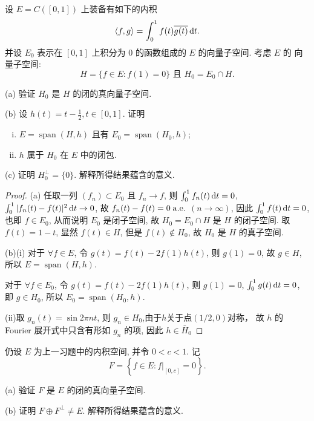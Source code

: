 \begin{exercise}
    设 $E=C([0,1])$ 上装备有如下的内积
    \[
    \langle f,g\rangle=\int_{0}^{1} f(t) \overline{g(t)}\mathop{}\!\mathrm{d} t.
    \]
    并设 $E_{0}$ 表示在 $[0,1]$ 上积分为 $0$ 的函数组成的 $E$ 的向量子空间. 考虑 $E$ 的 向量子空间:
    \[
    H=\{f \in E: f(1)=0\} \text {\ 且\ } H_{0}=E_{0} \cap H.
    \]

    (a) 验证 $H_{0}$ 是 $H$ 的闭的真向量子空间.

    (b) 设 $h(t)=t-\frac{1}{2}, t \in[0,1]$. 证明
    \begin{enumerate}[(i)]
    \item $E=\operatorname{span}(H, h)$ 且有 $E_{0}=\operatorname{span}\left(H_{0}, h\right)$;
    \item $h$ 属于 $H_{0}$ 在 $E$ 中的闭包.
    \end{enumerate}

    (c) 证明 $H_{0}^{\perp}=\{0\}$. 解释所得结果蕴含的意义.
\end{exercise}

\begin{proof}
    (a) 任取一列 $(f_n)\subset E_0$ 且 $f_n\rightarrow f$,
    则 $\int_0^1 f_n(t)\mathop{}\!\mathrm{d} t=0$, $\int_0^1|f_n(t)-f(t)|^2\mathop{}\!\mathrm{d} t\rightarrow0$,
    故 $f_n(t)-f(t)=0\;\mathrm{a.e.}$ $(n\to\infty)$,
    因此 $\int_0^1 f(t)\mathop{}\!\mathrm{d} t=0$, 也即 $f\in E_0$,
    从而说明 $E_0$ 是闭子空间, 故 $H_0=E_0\cap H$ 是 $H$ 的闭子空间.
    取 $f(t)=1-t$, 显然 $f(t)\in H$, 但是 $f(t)\notin H_0$, 故 $H_0$ 是 $H$ 的真子空间.

    (b)(i) 对于 $\forall f\in E$,
    令 $g(t)=f(t)-2f(1)h(t)$,
    则 $g(1)=0$, 故 $g\in H$, 所以 $E=\operatorname{span}(H,h)$.

    对于 $\forall f\in E_0$,
    令 $g(t)=f(t)-2f(1)h(t)$, 则 $g(1)=0$,
    $\int_0^1 g(t)\mathop{}\!\mathrm{d} t=0$, 即 $g\in H_0$, 所以 $E_0=\operatorname{span}(H_0,h)$.

    (ii)取 $g_n(t)=\sin2\pi nt$, 则 $g_n\in H_0$,由于$h$关于点$(1/2,0)$对称，
    故 $h$ 的 Fourier 展开式中只含有形如 $g_n$ 的项, 因此 $h\in\bar{H}_0$
\end{proof}



\begin{exercise}
    仍设 $E$ 为上一习题中的内积空间, 并令 $0<c<1$. 记
\[
F=\left\{f \in E:f|_{[0, c]}=0\right\}.
\]

(a) 验证 $F$ 是 $E$ 的闭的真向量子空间.

(b) 证明 $F \oplus F^{\perp} \neq E$. 解释所得结果蕴含的意义.
\end{exercise}

